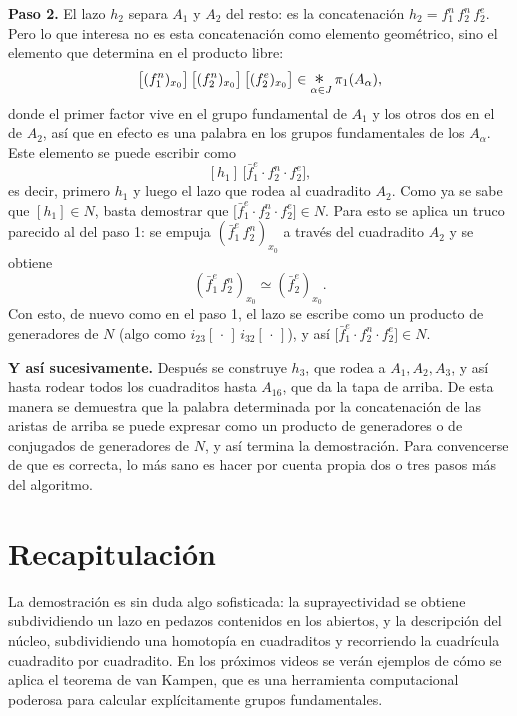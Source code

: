 \documentclass[11pt]{article}
\begin{document}
\noindent\textbf{Paso 2.} El lazo $h_2$ separa $A_1$ y $A_2$ del resto: es la concatenación $h_2=f_1^n\,f_2^n\,f_2^e$. Pero lo que interesa no es esta concatenación como elemento geométrico, sino el elemento que determina en el producto libre:
\[
  \bigl[(f_1^n)_{x_0}\bigr]\,\bigl[(f_2^n)_{x_0}\bigr]\,\bigl[(f_2^e)_{x_0}\bigr]\in \mathop{\scalebox{1.4}{$*$}}_{\alpha\in J}\pi_1(A_\alpha),
\]
donde el primer factor vive en el grupo fundamental de $A_1$ y los otros dos en el de $A_2$, así que en efecto es una palabra en los grupos fundamentales de los $A_\alpha$. Este elemento se puede escribir como
\[
  [h_1]\,\bigl[\bar f_1^e\cdot f_2^n\cdot f_2^e\bigr],
\]
es decir, primero $h_1$ y luego el lazo que rodea al cuadradito $A_2$. Como ya se sabe que $[h_1]\in N$, basta demostrar que $\bigl[\bar f_1^e\cdot f_2^n\cdot f_2^e\bigr]\in N$. Para esto se aplica un truco parecido al del paso 1: se empuja $(\bar f_1^e\,f_2^n)_{x_0}$ a través del cuadradito $A_2$ y se obtiene
\[
  (\bar f_1^e\,f_2^n)_{x_0}\simeq(\bar f_2^e)_{x_0}.
\]
Con esto, de nuevo como en el paso 1, el lazo se escribe como un producto de generadores de $N$ (algo como $i_{23}[\,\cdot\,]\,i_{32}[\,\cdot\,]$), y así $\bigl[\bar f_1^e\cdot f_2^n\cdot f_2^e\bigr]\in N$.

\noindent\textbf{Y así sucesivamente.} Después se construye $h_3$, que rodea a $A_1,A_2,A_3$, y así hasta rodear todos los cuadraditos hasta $A_{16}$, que da la tapa de arriba. De esta manera se demuestra que la palabra determinada por la concatenación de las aristas de arriba se puede expresar como un producto de generadores o de conjugados de generadores de $N$, y así termina la demostración. Para convencerse de que es correcta, lo más sano es hacer por cuenta propia dos o tres pasos más del algoritmo.

\section*{Recapitulación}

La demostración es sin duda algo sofisticada: la suprayectividad se obtiene subdividiendo un lazo en pedazos contenidos en los abiertos, y la descripción del núcleo, subdividiendo una homotopía en cuadraditos y recorriendo la cuadrícula cuadradito por cuadradito. En los próximos videos se verán ejemplos de cómo se aplica el teorema de van Kampen, que es una herramienta computacional poderosa para calcular explícitamente grupos fundamentales.

\begin{erratas}
\end{erratas}
\end{document}
